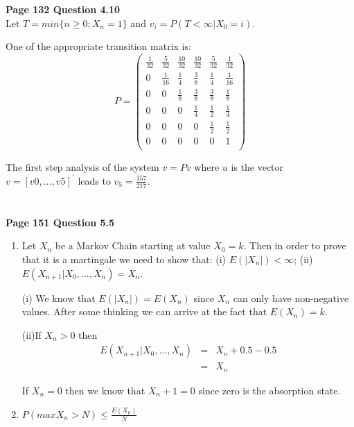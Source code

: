 \documentclass{article}
\begin{document}
\begin{flushleft}
\begin{eqnarray*}
\\
\end{eqnarray*}

\textbf{Page 132 Question 4.10}\\
Let $T=min\{n \geq0;X_n=1\}$ and $v_i=P(T<\infty|X_0=i)$.

One of the appropriate transition matrix is:
\[ P = \left ( \begin{array}{cccccc}
 \frac{1}{32} & \frac{5}{32}  & \frac{10}{32}  & \frac{10}{32} & \frac{5}{32} & \frac{1}{32}   \\
0 & \frac{1}{16}  & \frac{1}{4}  & \frac{3}{8} & \frac{1}{4} &\frac{1}{16} \\
0 & 0  & \frac{1}{8}  & \frac{3}{8} & \frac{3}{8} &\frac{1}{8} \\
0 & 0  & 0  & \frac{1}{4} & \frac{1}{2} &\frac{1}{4} \\
0 & 0  & 0  & 0 & \frac{1}{2} &\frac{1}{2} \\
0 & 0  & 0  & 0 & 0 & 1\\
\end{array} \right) \]

The first step analysis of the system $v=Pv$ where $u$ is the
vector $v=[v0,\ldots,v5]^{'}$ leads to $v_5= \frac{157}{217}$.


\begin{eqnarray*}
\\
\end{eqnarray*}

\textbf{Page 151 Question 5.5}\\
\begin{enumerate}
    \item Let $X_n$ be a Markov Chain starting at value $X_0=k$. Then
    in order to prove that it is a martingale we need to show
that: (i) $E(|X_n|)< \infty$; (ii) $E(X_{n+1}|
X_0,\ldots,X_n)=X_n$.

(i) We know that $E(|X_n|)=E(X_n)$ since $X_n$ can only have
non-negative values. After some thinking we can arrive at the fact
that $E(X_n)=k$.

(ii)If $X_n >0$ then
\begin{eqnarray*} E(X_{n+1}| X_0,\ldots,X_n)&=& X_n+ 0.5-0.5\\
&=& X_n
\end{eqnarray*}

If $X_n=0$ then we know that $X_n+1=0$ since zero is the
absorption state.
    \item $P(max X_n >N) \leq \frac{E(X_0)}{N}$
\end{enumerate}



\end{flushleft}
\end{document}
